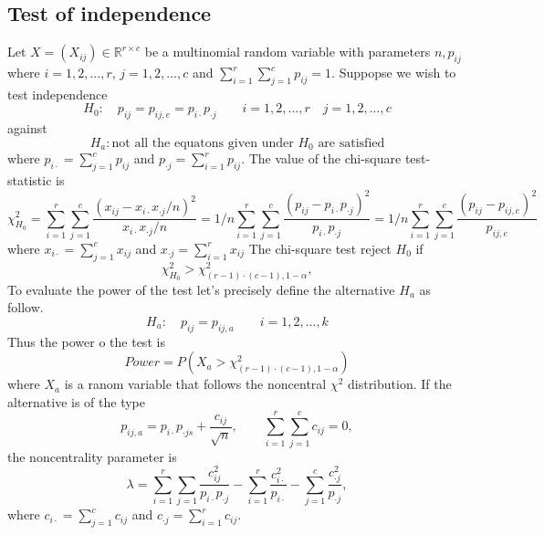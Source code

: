 \documentclass{article}
\begin{document}
\subsection{Test of independence}
Let $X=(X_{ij}) \in \mathbb{R}^{r \times c}$ be a multinomial random variable with
parameters $n,p_{ij}$ where $i=1,2,...,r$, $j=1,2,...,c$ and 
$\sum_{i=1}^r\sum_{j=1}^cp_{ij}=1$. 
Suppopse we wish to test independence
\begin{equation}
    H_0: \quad p_{ij}=p_{ij,e}=p_{i \cdot}p_{\cdot j} \qquad i =1,2,...,r \quad j=1,2,...,c
\end{equation}
against
\begin{equation}
    H_a: \mbox{not all the equatons given under $H_0$ are satisfied}
\end{equation}
where $p_{i \cdot} = \sum_{j=1}^c p_{ij}$ and $p_{\cdot j} = \sum_{i=1}^r p_{ij}$.
The value of the chi-square test-statistic is
\begin{equation}
    \chi^2_{H_0} = \sum_{i=1}^r\sum_{j=1}^c \frac{\left(x_{ij} - x_{i \cdot}x_{\cdot j}/n\right)^2}{x_{i \cdot}x_{\cdot j}/n} = 1/n \sum_{i=1}^r\sum_{j=1}^c \frac{\left(p_{ij} - p_{i \cdot}p_{\cdot j}\right)^2}{p_{i \cdot}p_{\cdot j}} = 1/n \sum_{i=1}^r\sum_{j=1}^c \frac{\left(p_{ij} - p_{ij,e}\right)^2}{p_{ij,e}} 
\end{equation}
where $x_{i \cdot} = \sum_{j=1}^c x_{ij}$ and $x_{\cdot j} = \sum_{i=1}^r x_{ij}$
The chi-square test reject $H_0$ if
\begin{equation}
    \chi^2_{H_0} > \chi^2_{(r-1)\cdot(c-1),1-\alpha},
\end{equation}
To evaluate the power of the test let's precisely define the alternative $H_a$ as follow.
\begin{equation}
    H_a: \quad p_{ij}=p_{ij,a} \qquad i =1,2,...,k
\end{equation}
Thus the power o the test is
\begin{equation}
    Power = P\left(X_a > \chi^2_{(r-1)\cdot(c-1),1-\alpha}\right)
\end{equation}
where $X_a$ is a ranom variable that follows the noncentral $\chi^2$ distribution.
If the alternative is of the type
\begin{equation}
    p_{ij,a} = p_{i\cdot}p_{\cdot js} + \frac{c_{ij}}{\sqrt{n}}, \qquad\sum_{i=1}^{r}\sum_{j=1}^{c}c_{ij}=0,
\end{equation}
the noncentrality parameter is 
\begin{equation}
    \lambda = \sum_{i=1}^{r}\sum_{j=1} \frac{c_{ij}^2}{p_{i\cdot}p_{\cdot j}} - \sum_{i=1}^{r}\frac{c_{i \cdot}^2}{p_{i \cdot}} - \sum_{j=1}^{c}\frac{c_{\cdot j}^2}{p_{\cdot j}},
\end{equation}
where $c_{i \cdot} = \sum_{j=1}^c c_{ij}$ and $c_{\cdot j} = \sum_{i=1}^r c_{ij}$.
\end{document}
